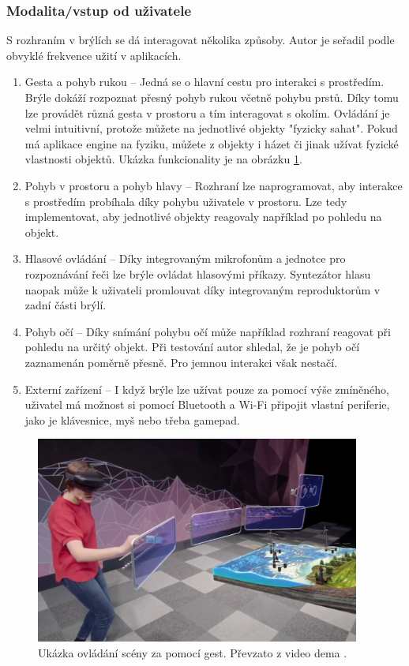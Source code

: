 \subsubsection{Modalita/vstup od uživatele}
S rozhraním v brýlích se dá interagovat několika způsoby. Autor je seřadil podle obvyklé frekvence užití v aplikacích.
\begin{enumerate}
    \item Gesta a pohyb rukou -- Jedná se o hlavní cestu pro interakci s prostředím. Brýle dokáží rozpoznat přesný pohyb rukou včetně pohybu prstů. Díky tomu lze provádět různá gesta v prostoru a tím interagovat s okolím. Ovládání je velmi intuitivní, protože můžete na jednotlivé objekty "fyzicky sahat". Pokud má aplikace engine na fyziku, můžete z objekty i házet či jinak užívat fyzické vlastnosti objektů. Ukázka funkcionality je na obrázku \ref{pic:hololens2Demo}.
   \item Pohyb v prostoru a pohyb hlavy -- Rozhraní lze naprogramovat, aby interakce s prostředím probíhala díky pohybu uživatele v prostoru. Lze tedy implementovat, aby jednotlivé objekty reagovaly například po pohledu na objekt. 
    \item Hlasové ovládání -- Díky integrovaným mikrofonům a jednotce pro rozpoznávání řeči lze brýle ovládat hlasovými příkazy. Syntezátor hlasu naopak může k uživateli promlouvat díky integrovaným reproduktorům v zadní části brýlí.
    \item Pohyb očí -- Díky snímání pohybu očí může například rozhraní reagovat při pohledu na určitý objekt. Při testování autor shledal, že je pohyb očí zaznamenán poměrně přesně. Pro jemnou interakci však nestačí.
 
    \item Externí zařízení -- I když brýle lze užívat pouze za pomocí výše zmíněného, uživatel má možnost si pomocí Bluetooth a Wi-Fi připojit vlastní periferie, jako je klávesnice, myš nebo třeba gamepad. 
\end{enumerate}
\begin{figure}[ht] 
	\centering
	\includegraphics[width=0.95\textwidth]{obrazky-figures/ar/hololensDemo.png}
	\caption{Ukázka ovládání scény za pomocí gest. Převzato z video dema \cite{hololens2videoDemo}.}
	\label{pic:hololens2Demo}
\end{figure}

